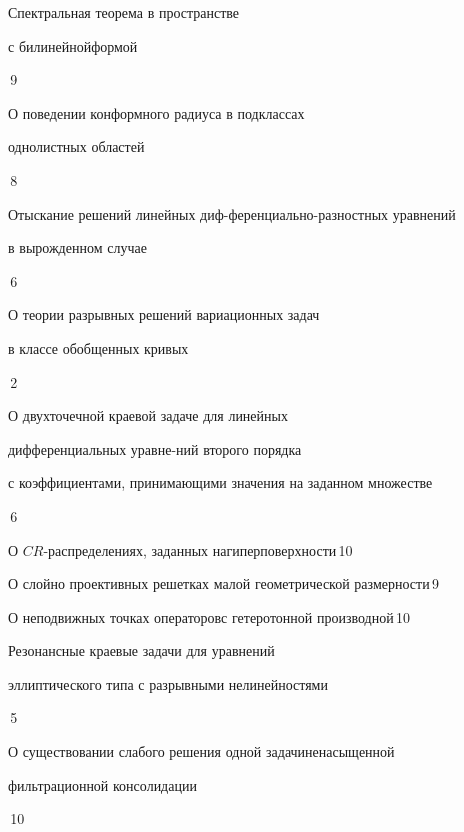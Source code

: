 

{Спектральная теорема в пространстве


с билинейной\newline формой}{\No\,9}




{О поведении конформного радиуса в подклассах\newline


однолистных областей}{\No\,8}




{Отыскание решений линейных диф-\newline ференциально-разностных уравнений 


в вырожденном случае}{\No\,6}




{О теории разрывных решений вариационных задач \newline


в классе обобщенных кривых}{\No\,2}




{О двухточечной краевой задаче для линейных 


дифференциальных уравне-\newline ний второго порядка 


с коэффициентами, принимающими значения на заданном множестве}{\No\,6}




{О $CR$-распределениях, заданных на\newline гиперповерхности}{\No\,10}




{О слойно проективных решетках малой геометрической размерности}{\No\,9}




{О неподвижных точках операторов\newline с гетеротонной производной}{\No\,10}




{Резонансные краевые задачи для уравнений \newline


эллиптического типа с разрывными нелинейностями}{\No\,5}




{О существовании слабого решения одной задачи\newline ненасыщенной


фильтрационной консолидации}{\No\,10}


